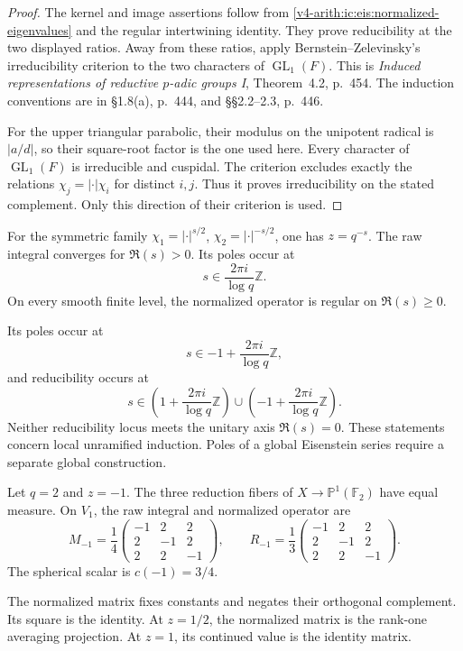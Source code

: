 \begin{proof}
The kernel and image assertions follow from
\eqref{v4-arith:ic:eis:normalized-eigenvalues} and the regular intertwining
identity.
They prove reducibility at the two displayed ratios.
Away from these ratios, apply Bernstein--Zelevinsky's irreducibility
criterion to the two characters of $\operatorname{GL}_1(F)$.
This is \emph{Induced representations of reductive $p$-adic groups I},
Theorem~4.2, p.~454.
The induction conventions are in \S1.8(a), p.~444,
and \S\S2.2--2.3, p.~446.

For the upper triangular parabolic, their modulus on the unipotent
radical is $|a/d|$, so their square-root factor is the one used here.
Every character of $\operatorname{GL}_1(F)$ is irreducible and cuspidal.
The criterion excludes exactly the relations
$\chi_j=|\cdot|\chi_i$ for distinct $i,j$.
Thus it proves irreducibility on the stated complement.
Only this direction of their criterion is used.
\end{proof}

For the symmetric family
$\chi_1=|\cdot|^{s/2}$, $\chi_2=|\cdot|^{-s/2}$, one has $z=q^{-s}$.
The raw integral converges for $\Re(s)>0$.
Its poles occur at
\[
 s\in\frac{2\pi i}{\log q}\mathbb Z.
\]
On every smooth finite level, the normalized operator is regular on
$\Re(s)\ge0$.

Its poles occur at
\[
 s\in-1+\frac{2\pi i}{\log q}\mathbb Z,
\]
and reducibility occurs at
\[
 s\in\left(1+\frac{2\pi i}{\log q}\mathbb Z\right)
 \cup\left(-1+\frac{2\pi i}{\log q}\mathbb Z\right).
\]
Neither reducibility locus meets the unitary axis $\Re(s)=0$.
These statements concern local unramified induction.
Poles of a global Eisenstein series require a separate global construction.

\begin{example}
Let $q=2$ and $z=-1$.
The three reduction fibers of $X\to\mathbb P^1(\mathbb F_2)$ have equal measure.
On $V_1$, the raw integral and normalized operator are
\[
 M_{-1}=\frac14
 \begin{pmatrix}-1&2&2\\2&-1&2\\2&2&-1\end{pmatrix},
 \qquad
 R_{-1}=\frac13
 \begin{pmatrix}-1&2&2\\2&-1&2\\2&2&-1\end{pmatrix}.
\]
The spherical scalar is $c(-1)=3/4$.

The normalized matrix fixes constants and negates their orthogonal complement.
Its square is the identity.
At $z=1/2$, the normalized matrix is the rank-one averaging projection.
At $z=1$, its continued value is the identity matrix.
\end{example}

